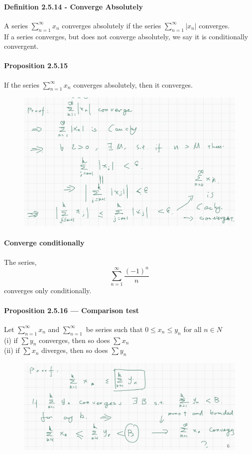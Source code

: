 \documentclass{article}
\begin{document}
\paragraph{Definition 2.5.14 - Converge Absolutely}
A series $\sum_{n=1}^{\infty}x_n$ converges absolutely if the series $\sum_{n=1}^{\infty}|x_n|$ converges.\\
If a series converges, but does not converge absolutely, we say
it is conditionally convergent.
\paragraph{Proposition 2.5.15}
If the series $\sum_{n=1}^{\infty}x_n$ converges absolutely, then it converges.
\begin{figure}[H]
    \centering
    \includegraphics{0143}
\end{figure}
\paragraph{Converge conditionally}
The series,$$\sum_{n=1}^{\infty}\frac{(-1)^n}{n}$$ converges only conditionally.
\paragraph{Proposition 2.5.16 — Comparison test}
Let $\sum_{n=1}^{\infty}x_n$ and $\sum_{n=1}^{\infty}$ be series such that $0\leq x_n\leq y_n$ for all $n\in N$\\
    (i) if $\sum y_n$ converges, then so does $\sum x_n$\\
    (ii) if $\sum x_n$ diverges, then so does $\sum y_n$
\begin{figure}[H]
    \centering
    \includegraphics{0144}
\end{figure}
\end{document}

